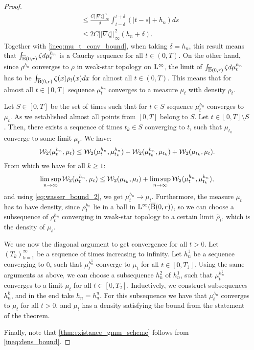 \begin{proof}
\[\begin{aligned}
& \leq \frac{C ||\nabla \zeta||_{\infty}^2}{\delta} \int_{t-\delta}^{t+\delta} (|t-s| +h_n) ds \\
& \leq 2C ||\nabla \zeta||_{\infty}^2 (h_n + \delta).
\end{aligned}
\]
Together with \eqref{ineq:mu_t_conv_bound}, when taking $\delta = h_n$, this result means that $\int_{\operatorname{\overline{B}}(0,r)} \zeta d\mu_t^{h_n}$ is a Cauchy sequence for all $t \in (0, T)$. On the other hand, since $\rho^{h_n}$ converges to $\rho$ in weak-star topology on $\mathrm{L}^{\infty}$, the limit of $\int_{\operatorname{\overline{B}}(0,r)} \zeta d\mu_t^{h_n}$ has to be $\int_{\operatorname{\overline{B}}(0,r)} \zeta(x) \rho_t(x) dx$ for almost all $t \in (0,T)$. This means that for almost all $t \in [0,T]$ sequence $\mu_{t}^{h_n}$ converges to a measure $\mu_t$ with density $\rho_t$.

Let $ S \in [0,T]$ be the set of times such that for $t \in S$ sequence $\mu_{t}^{h_n}$ converges to $\mu_t$. As we established almost all points from $[0,T]$ belong to $S$. Let $ t \in [0,T] \setminus S$. Then, there exists a sequence of times $t_k \in S$ converging to $t$, such that $\mu_{t_k}$ converge to some limit $\mu_t$. We have:
\[
{\cal W}_2(\mu_t^{h_n}, \mu_t) \leq {\cal W}_2(\mu_{t}^{h_n}, \mu_{t_k}^{h_n}) + {\cal W}_2(\mu_{t_k}^{h_n}, \mu_{t_k}) + {\cal W}_2(\mu_{t_k}, \mu_t).
\]
From which we have for all $k \geq 1$:
\[
\limsup_{n \rightarrow \infty} {\cal W}_2(\mu_{t}^{h_n}, \mu_t) \leq {\cal W}_2(\mu_{t_k}, \mu_t) + \limsup_{n\rightarrow \infty} {\cal W}_2(\mu_t^{h_n}, \mu_{t_k}^{h_n}),
\]
and using \eqref{eq:wasser_bound_2}, we get $\mu_{t}^{h_n} \rightarrow \mu_t$. Furthermore, the measure $\mu_t$ has to have density, since $\rho_{t}^{h_n}$ lie in a ball in $\mathrm{L}^{\infty}(\operatorname{\overline{B}}(0,r))$, so we can choose a subsequence of $\rho_t^{h_n}$ converging in weak-star topology to a certain limit $\hat{\rho}_t$, which is the density of $\mu_t$. 

We use now the diagonal argument to get convergence for all $t >0$. Let $(T_k)_{k=1}^{\infty}$ be a sequence of times increasing to infinity. Let $h_{n}^1$ be a sequence converging to $0$, such that $\mu_t^{h_n^1}$ converge to $\mu_t$ for all $t \in [0, T_1]$. Using the same arguments as above, we can choose a subsequence $h_n^2$ of $h_n^1$, such that $\mu_{t}^{h_n^2}$ converges to a limit $\mu_t$ for all $t \in [0, T_2]$. Inductively, we construct subsequences $h_{n}^k$, and in the end take $h_n = h_n^n$. For this subsequence we have that $\mu_t^{h_n}$ converges to $\mu_t$ for all $t > 0$, and $\mu_t$ has a density satisfying the bound from the statement of the theorem.

Finally, note that \eqref{thm:existance_gmm_scheme} follows from \eqref{ineq:dens_bound}.
\end{proof}

